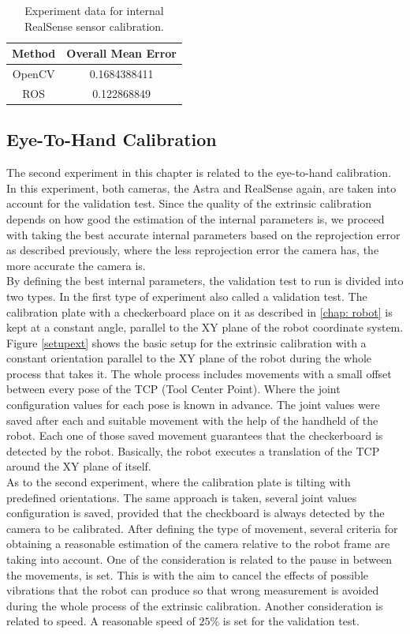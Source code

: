 \begin{table}[b]
\renewcommand{\arraystretch}{1.3}
\caption{Experiment data for internal RealSense sensor calibration.}
\label{real1}
\centering
\begin{tabular}{|c||c|}
\hline
Method & Overall Mean Error\\
\hline
OpenCV &  0.1684388411\\
\hline
ROS &  0.122868849\\
\hline
\hline
\end{tabular}
\end{table}


\subsection{Eye-To-Hand Calibration}

The second experiment in this chapter is related to the eye-to-hand calibration. In this experiment, both cameras, the Astra and RealSense again, are taken into account for the validation test. Since the quality of the extrinsic calibration depends on how good the estimation of the internal parameters is, we proceed with taking the best accurate internal parameters based on the reprojection error as described previously, where the less reprojection error the camera has, the more accurate the camera is. \\
By defining the best internal parameters, the validation test to run is divided into two types. In the first type of experiment also called a validation test. The calibration plate with a checkerboard place on it as described in \ref{chap: robot} is kept at a constant angle, parallel to the XY plane of the robot coordinate system. Figure \ref{setupext} shows the basic setup for the extrinsic calibration with a constant orientation parallel to the XY plane of the robot during the whole process that takes it. The whole process includes movements with a small offset between every pose of the TCP (Tool Center Point). Where the joint configuration values for each pose is known in advance. The joint values were saved after each and suitable movement with the help of the handheld of the robot. Each one of those saved movement guarantees that the checkerboard is detected by the robot. Basically, the robot executes a translation of the TCP around the XY plane of itself.\\ 
As to the second experiment, where the calibration plate is tilting with predefined orientations. The same approach is taken, several joint values configuration is saved, provided that the checkboard is always detected by the camera to be calibrated. After defining the type of movement, several criteria for obtaining a reasonable estimation of the camera relative to the robot frame are taking into account. One of the consideration is related to the pause in between the movements, is set. This is with the aim to cancel the effects of possible vibrations that the robot can produce so that wrong measurement is avoided during the whole process of the extrinsic calibration. Another consideration is related to speed. A reasonable speed of $25\%$ is set for the validation test. \\

